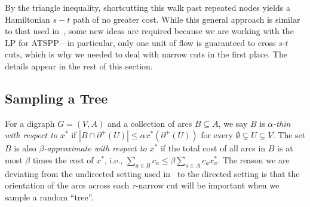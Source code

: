 \documentclass[11pt]{article}
\theoremstyle{definition}
\def\A{{B}}
\begin{document}
By the triangle inequality,
shortcutting this walk past repeated nodes yields a Hamiltonian $s-t$ path
of no greater cost. While this general approach is similar
to that used in~\cite{AGMSS}, some new ideas are required because we are
working with the LP for ATSPP---in particular, only one unit of flow is
guaranteed to cross $s$-$t$ cuts, which is why we needed to deal with
narrow cuts in the first place. The details appear in the rest of this section.

\subsection{Sampling a Tree}\label{sec:sample}

For a digraph $G = (V,A)$ and a collection of arcs $\A \subseteq A$, we say $\A$ is
\emph{$\alpha$-thin with respect to $x^*$} if $|\A
\cap \partial^+(U)| \leq \alpha x^*(\partial^+(U))$ for every $\emptyset
\subsetneq U \subsetneq V$. The set $\A$ is also
\emph{$\beta$-approximate with respect to $x^*$} if the total cost of
all arcs in $\A$ is at most $\beta$ times the cost of $x^*$, i.e.,
$\sum_{a \in \A} c_a \leq \beta \sum_{a \in A} c_a x_a^*$.  The reason
we are deviating from the undirected setting used in~\cite{AGMSS} to the directed setting is that the
orientation of the arcs across each $\tau$-narrow cut will be important
when we sample a random ``tree''.
\end{document}
